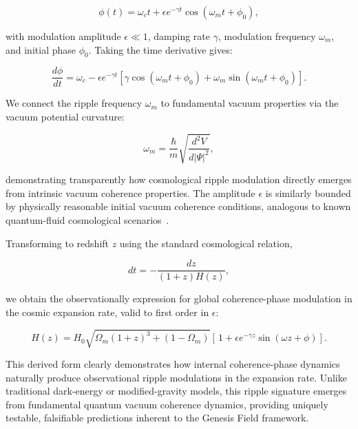 \begin{equation}
\phi(t)=\omega_c t + \epsilon e^{-\gamma t}\cos(\omega_m t+\phi_0),
\label{eq:phase_modulation_solution}
\end{equation}

with modulation amplitude \(\epsilon \ll 1\), damping rate \(\gamma\), modulation frequency \(\omega_m\), and initial phase \(\phi_0\). Taking the time derivative gives:

\begin{equation}
\frac{d\phi}{dt}=\omega_c - \epsilon e^{-\gamma t}\left[\gamma\cos(\omega_m t+\phi_0)+\omega_m\sin(\omega_m t+\phi_0)\right].
\label{eq:phase_modulation_derivative}
\end{equation}

We connect the ripple frequency \(\omega_m\) to fundamental vacuum properties via the vacuum potential curvature:

\begin{equation}
\omega_m = \frac{\hbar}{m}\sqrt{\frac{d^2V}{d|\Psi|^2}},
\label{eq:omega_derivation}
\end{equation}

demonstrating transparently how cosmological ripple modulation directly emerges from intrinsic vacuum coherence properties. The amplitude \(\epsilon\) is similarly bounded by physically reasonable initial vacuum coherence conditions, analogous to known quantum-fluid cosmological scenarios~\cite{volovik2009,Barcelo2005}.

Transforming to redshift \(z\) using the standard cosmological relation,

\begin{equation}
dt=-\frac{dz}{(1+z)H(z)},
\label{eq:redshift_time_relation}
\end{equation}

we obtain the observationally expression for global coherence-phase modulation in the cosmic expansion rate, valid to first order in \(\epsilon\):

\begin{equation}
H(z)=H_0\sqrt{\Omega_m(1+z)^3+(1-\Omega_m)}\left[\,1+\epsilon e^{-\gamma z}\sin(\omega z+\phi)\right].
\label{eq:final_global_ripple}
\end{equation}

This derived form clearly demonstrates how internal coherence-phase dynamics naturally produce observational ripple modulations in the expansion rate. Unlike traditional dark-energy or modified-gravity models, this ripple signature emerges from fundamental quantum vacuum coherence dynamics, providing uniquely testable, falsifiable predictions inherent to the Genesis Field framework.

